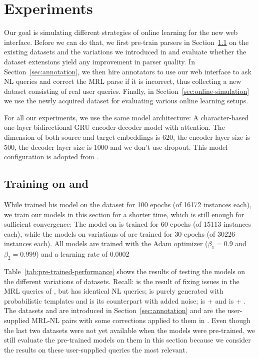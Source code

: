 \chapter{Experiments}
\label{ch:experiments}

Our goal is simulating different strategies of online learning for the new web
interface. Before we can do that, we first pre-train parsers in
Section~\ref{sec:pre-training} on the existing datasets \nlmapstwo{} and the
variations we introduced in \nlmapsthree{} and evaluate whether the dataset
extensions yield any improvement in parser quality. In
Section~\ref{sec:annotation}, we then hire annotators to use our web interface
to ask NL queries and correct the MRL parse if it is incorrect, thus collecting
a new dataset consisting of real user queries. Finally, in
Section~\ref{sec:online-simulation} we use the newly acquired dataset for
evaluating various online learning setups.

For all our experiments, we use the same model architecture: A character-based
one-layer bidirectional GRU encoder-decoder \parencite{cho-2014} model with
attention.\parencite{bahdanau-2015} The dimension of both source and target
embeddings is \num{620}, the encoder layer size is \num{500}, the decoder layer
size is \num{1000} and we don’t use dropout. This model configuration is adopted
from \textcite{staniek-2020}.

\section{Training on \nlmapstwo{} and \nlmapsthree{}}
\label{sec:pre-training}

While \textcite{staniek-2020} trained his model on the \nlmapstwo{} dataset for
\num{100} epochs (of \num{16172} instances each), we train our models in this
section for a shorter time, which is still enough for sufficient convergence:
The model on \nlmapstwoone{} is trained for \num{60} epochs (of \num{15113}
instances each), while the models on variations of \nlmapsthree{} are trained
for \num{30} epochs (of \num{30226} instances each). All models are trained with
the Adam optimizer (\(\beta_1 = 0.9\) and \(\beta_2 = 0.999\)) and a learning
rate of \num{0.0002}

Table~\ref{tab:pre-trained-performance} shows the results of testing the models
on the different variations of \nlmaps{} datasets. Recall: \nlmtwoone{} is the
result of fixing issues in the MRL queries of \nlmtwo{}, but has identical NL
queries; \nlmthreea{} is purely generated with probabilistic templates and
\nlmthreeb{} is its counterpart with added noise; \nlmthreenormal{} is
\nlmtwoone{} + \nlmthreea{} and \nlmthree{} is \nlmtwoone{} + \nlmthreeb{}. The
datasets \nlmfourraw{} and \nlmfour{} are introduced in
Section~\ref{sec:annotation} and are the user-supplied MRL-NL pairs with some
corrections applied to them in \nlmfour{}. Even though the last two datasets
were not yet available when the models were pre-trained, we still evaluate the
pre-trained models on them in this section because we consider the results on
these user-supplied queries the most relevant.

